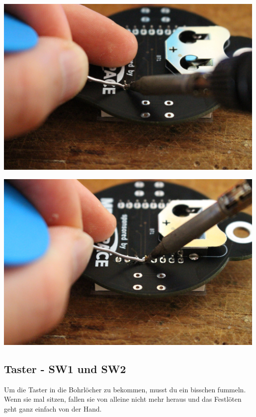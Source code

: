 \documentclass{article}
\begin{document}
\begin{minipage}[b]{0.5\textwidth}
	\includegraphics[width=\textwidth]{Bilder2022/IMG_8227.JPG}
\end{minipage}
\begin{minipage}[b]{0.5\textwidth}
	\includegraphics[width=\textwidth]{Bilder2022/IMG_8228.JPG}
\end{minipage}

\subsection{Taster - SW1 und SW2}

Um die Taster in die Bohrlöcher zu bekommen, musst du ein bisschen fummeln. Wenn sie mal sitzen, fallen sie von alleine nicht mehr heraus und das Festlöten geht ganz einfach von der Hand.
\end{document}
